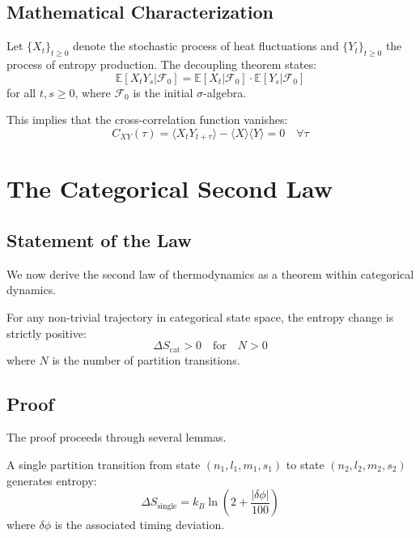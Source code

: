 \subsection{Mathematical Characterization}

Let $\{X_t\}_{t \geq 0}$ denote the stochastic process of heat fluctuations and $\{Y_t\}_{t \geq 0}$ the process of entropy production. The decoupling theorem states:
\begin{equation}
    \mathbb{E}[X_t Y_s | \mathcal{F}_0] = \mathbb{E}[X_t | \mathcal{F}_0] \cdot \mathbb{E}[Y_s | \mathcal{F}_0]
\end{equation}
for all $t, s \geq 0$, where $\mathcal{F}_0$ is the initial $\sigma$-algebra.

This implies that the cross-correlation function vanishes:
\begin{equation}
    C_{XY}(\tau) = \langle X_t Y_{t+\tau} \rangle - \langle X \rangle \langle Y \rangle = 0 \quad \forall \tau
\end{equation}

\section{The Categorical Second Law}
\label{sec:secondlaw}

\subsection{Statement of the Law}

We now derive the second law of thermodynamics as a theorem within categorical dynamics.

\begin{theorem}
\label{thm:secondlaw}
For any non-trivial trajectory in categorical state space, the entropy change is strictly positive:
\begin{equation}
    \Delta S_{\text{cat}} > 0 \quad \text{for} \quad N > 0
\end{equation}
where $N$ is the number of partition transitions.
\end{theorem}

\subsection{Proof}

The proof proceeds through several lemmas.

\begin{lemma}
\label{lem:traversal}
A single partition transition from state $(n_1, l_1, m_1, s_1)$ to state $(n_2, l_2, m_2, s_2)$ generates entropy:
\begin{equation}
    \Delta S_{\text{single}} = k_B \ln\left(2 + \frac{|\delta\phi|}{100}\right)
\end{equation}
where $\delta\phi$ is the associated timing deviation.
\end{lemma}

